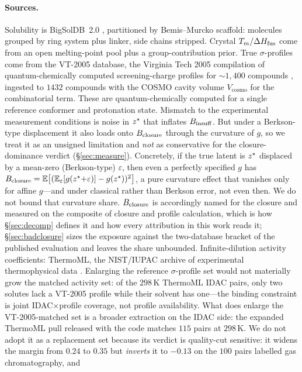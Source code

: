 \paragraph{Sources.} Solubility is BigSolDB~2.0 \cite{krasnov2025bigsoldb}, partitioned by
Bemis--Murcko scaffold: molecules grouped by ring system plus linker, side chains stripped. Crystal
$T_m/\Delta H_{\mathrm{fus}}$ come from an open melting-point pool plus a group-contribution prior. True
$\sigma$-profiles come from the VT-2005 database, the Virginia Tech 2005 compilation of
quantum-chemically computed screening-charge profiles for ${\sim}1{,}400$ compounds
\cite{mullins2006}, ingested to $1432$ compounds with the COSMO cavity volume
$V_{\mathrm{cosmo}}$ for the combinatorial term. These are quantum-chemically computed for a single reference conformer and protonation state.
Mismatch to the experimental measurement conditions is noise in $z^\star$ that inflates $B_{\mathrm{insuff}}$.
But under a Berkson-type displacement it also loads onto $B_{\mathrm{closure}}$ through the curvature of $g$, so
we treat it as an unsigned limitation and \emph{not} as conservative for the closure-dominance
verdict (\S\ref{sec:measure}). Concretely, if
the true latent is $z^\star$ displaced by a mean-zero (Berkson-type) $\varepsilon$, then even a
perfectly specified $g$ has
$B_{\mathrm{closure}}=\mathbb{E}\big[(\mathbb{E}_\varepsilon[g(z^\star{+}\varepsilon)]-g(z^\star))^2\big]$, a pure curvature
effect that vanishes only for affine $g$---and under classical rather than Berkson error, not even
then. We do not bound that curvature share. $B_{\mathrm{closure}}$ is accordingly named for the closure and
measured on the composite of closure and profile calculation, which is how \S\ref{sec:decomp}
defines it and how every attribution in this work reads it; \S\ref{sec:badclosure} sizes the exposure
against the two-database bracket of the published evaluation and leaves the share unbounded. Infinite-dilution
activity coefficients: ThermoML, the NIST/IUPAC archive of experimental thermophysical data
\cite{frenkel2011thermoml}. Enlarging the reference $\sigma$-profile set would not materially
grow the matched activity set: of the $298$\,K ThermoML IDAC pairs, only two solutes lack a VT-2005
profile while their solvent has one---the binding constraint is joint IDAC$\times$profile coverage, not
profile availability. What does enlarge the VT-2005-matched set is a broader extraction on the IDAC side: the
expanded ThermoML pull released with the code matches $115$ pairs at $298$\,K. We do not adopt it
as a replacement set because its verdict is quality-cut sensitive: it widens the margin from
$0.24$ to $0.35$ but \emph{inverts} it to $-0.13$ on the $100$ pairs labelled gas chromatography, and
